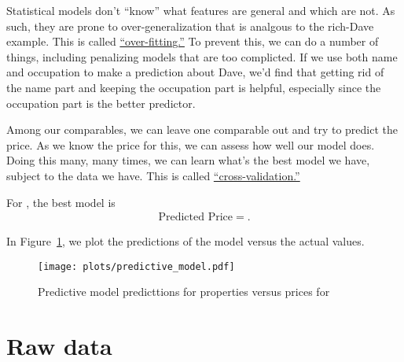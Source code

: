 \documentclass[
10pt, %
a4paper, %
oneside, %
headinclude,footinclude, %
BCOR5mm, %
]{scrartcl}
\begin{document}
Statistical models don't ``know'' what features are general and which are not.
As such, they are prone to over-generalization that is analgous to the rich-Dave example. 
This is called \href{https://en.wikipedia.org/wiki/Overfitting}{``over-fitting.''}
To prevent this, we can do a number of things, including penalizing models that are too complicted.
If we use both name and occupation to make a prediction about Dave, we'd find that getting rid of the name part and keeping the occupation part is helpful, especially since the occupation part is the better predictor. 

Among our comparables, we can leave one comparable out and try to predict the price.
As we know the price for this, we can assess how well our model does.
Doing this many, many times, we can learn what's the best model we have, subject to the data we have.
This is called \href{https://en.wikipedia.org/wiki/Cross-validation_(statistics)}{``cross-validation.''}

For \PropertyName{}, the best model is
\begin{align}
\mbox{Predicted Price} = .
\end{align}

In Figure~\ref{fig:predictive_model}, we plot the predictions of the model versus the actual values.

\begin{figure}
\centering
\caption{Predictive model predicttions for properties versus prices for \PropertyName{}} \label{fig:predictive_model}  
\texttt{[image: plots/predictive\_model.pdf]} 
\end{figure}

\renewcommand{\refname}{\spacedlowsmallcaps{References}} %



\appendix

\section{Raw data} \label{sec:raw_data} 
\end{document}
